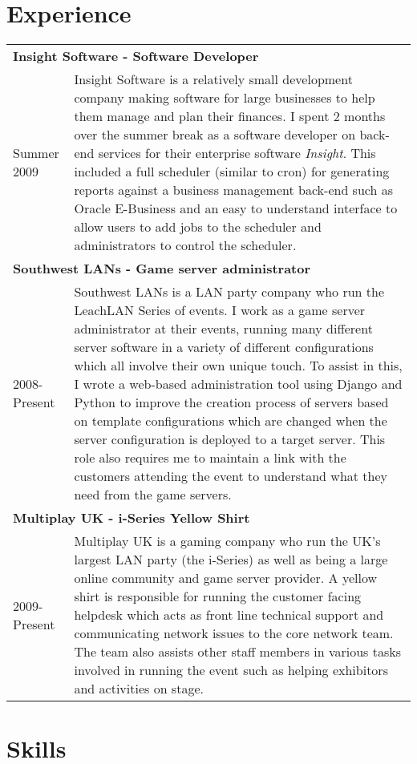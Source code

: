 \documentclass[11pt]{report}
\begin{document}
\section*{Experience}
\begin{tabularx}{\textwidth}{l X}
\multicolumn{2}{l}{\bf Insight Software - Software Developer} \\
Summer 2009 & Insight Software is a relatively small development company making software for large businesses to help them manage and plan their finances.
I spent 2 months over the summer break as a software developer on back-end services for their enterprise software {\it Insight}.
This included a full scheduler (similar to cron) for generating reports against a business management back-end such as Oracle E-Business
and an easy to understand interface to allow users to add jobs to the scheduler and administrators to control the scheduler. \\
\multicolumn{2}{l}{\bf Southwest LANs - Game server administrator} \\
2008-Present & Southwest LANs is a LAN party company who run the LeachLAN Series of events.
I work as a game server administrator at their events, running many different server software in a variety of different configurations which all involve their own unique touch.
To assist in this, I wrote a web-based administration tool using Django and Python to improve the creation process of servers based on template configurations which are changed when the server configuration is deployed to a target server.
This role also requires me to maintain a link with the customers attending the event to understand what they need from the game servers.\\
\multicolumn{2}{l}{\bf Multiplay UK - i-Series Yellow Shirt} \\
2009-Present & Multiplay UK is a gaming company who run the UK's largest LAN party (the i-Series) as well as being a large online community and game server provider.
A yellow shirt is responsible for running the customer facing helpdesk which acts as front line technical support and communicating network issues to the core network team.
The team also assists other staff members in various tasks involved in running the event such as helping exhibitors and activities on stage.
\end{tabularx}
\newpage
\section*{Skills}
\end{document}
